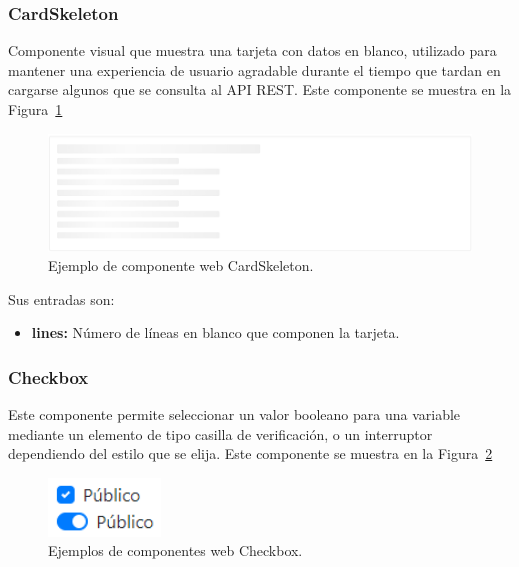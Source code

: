 \documentclass[a4paper, 12pt]{book}
\begin{document}
\subsubsection{CardSkeleton}
\label{subsec:wc_card_skeleton}
Componente visual que muestra una tarjeta con datos en blanco, utilizado para mantener una experiencia de usuario agradable durante el tiempo que tardan en cargarse algunos que se consulta al API REST.
Este componente se muestra en la Figura~\ref{fig:component_card_skeleton}

\begin{figure}
  \centering
  \includegraphics[width=15cm, keepaspectratio]{img/CardSkeleton.PNG}
  \caption{Ejemplo de componente web CardSkeleton.}\label{fig:component_card_skeleton}
\end{figure}

Sus entradas son:

		\begin{itemize}
		\item \textbf{lines:} Número de líneas en blanco que componen la tarjeta.
		\end{itemize}

\subsubsection{Checkbox}
\label{subsec:wc_checkbox}
Este componente permite seleccionar un valor booleano para una variable mediante un elemento de tipo casilla de verificación, o un interruptor dependiendo del estilo que se elija.
Este componente se muestra en la Figura~\ref{fig:component_checkbox}

\begin{figure}
  \centering
  \includegraphics[width=3cm, keepaspectratio]{img/Checkbox.PNG}
  \caption{Ejemplos de componentes web Checkbox.}\label{fig:component_checkbox}
\end{figure}
\end{document}
